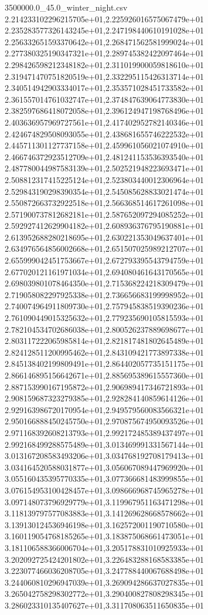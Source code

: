 \begin{filecontents*}{3500000.0_45.0_winter_night.csv}
2.214233102296215705e+01,2.225926016575067479e+01
2.235283577326143245e+01,2.247198440610191028e+01
2.256332651593370642e+01,2.268471562581999024e+01
2.277380325190347321e+01,2.289745382422097464e+01
2.298426598212348182e+01,2.311019900059818610e+01
2.319471470751820519e+01,2.332295115426313714e+01
2.340514942903334017e+01,2.353571028451733582e+01
2.361557014761032747e+01,2.374847639064773830e+01
2.382597686418072058e+01,2.396124947198768496e+01
2.403636957969727561e+01,2.417402952782140346e+01
2.424674829508093055e+01,2.438681655746222532e+01
2.445711301127737158e+01,2.459961056021074910e+01
2.466746372923512709e+01,2.481241153536393540e+01
2.487780044987583139e+01,2.502521948223693471e+01
2.508812317415225124e+01,2.523803440012306964e+01
2.529843190298390354e+01,2.545085628833021474e+01
2.550872663732922518e+01,2.566368514617261098e+01
2.571900737812682181e+01,2.587652097294085252e+01
2.592927412629904182e+01,2.608936376795190881e+01
2.613952688280218695e+01,2.630221353049637401e+01
2.634976564856002668e+01,2.651507025989212707e+01
2.655999042451753667e+01,2.672793395543794759e+01
2.677020121161971034e+01,2.694080461643170565e+01
2.698039801078464350e+01,2.715368224218309479e+01
2.719058082297925338e+01,2.736656683199998952e+01
2.740074964911809730e+01,2.757945838519390236e+01
2.761090449015325632e+01,2.779235690105815593e+01
2.782104534702686038e+01,2.800526237889698677e+01
2.803117222065985814e+01,2.821817481802645489e+01
2.824128511200995462e+01,2.843109421773897338e+01
2.845138402199809491e+01,2.864402057735151175e+01
2.866146895156642671e+01,2.885695389615557360e+01
2.887153990167195872e+01,2.906989417346721893e+01
2.908159687323279385e+01,2.928284140859614126e+01
2.929163986720170954e+01,2.949579560083566321e+01
2.950166888450245750e+01,2.970875674950093526e+01
2.971168392608213793e+01,2.992172485389437497e+01
2.992168499288575489e+01,3.013469991331567144e+01
3.013167208583493206e+01,3.034768192708179413e+01
3.034164520588031877e+01,3.056067089447969920e+01
3.055160435395770335e+01,3.077366681483999855e+01
3.076154953100428457e+01,3.098666968745965278e+01
3.097148073796929779e+01,3.119967951163471298e+01
3.118139797577083883e+01,3.141269628668578662e+01
3.139130124536946198e+01,3.162572001190710580e+01
3.160119054768185265e+01,3.183875068661473051e+01
3.181106588366006704e+01,3.205178831010925933e+01
3.202092725424201802e+01,3.226483288168583385e+01
3.223077466036208705e+01,3.247788440067688498e+01
3.244060810296947039e+01,3.269094286637027835e+01
3.265042758298302772e+01,3.290400827808298345e+01
3.286023310135407627e+01,3.311708063511650835e+01

\end{filecontents*}
